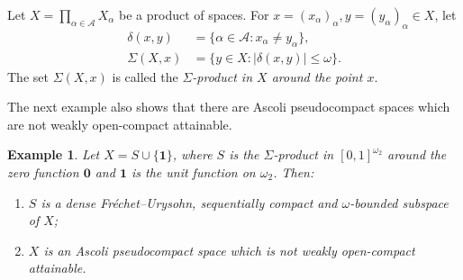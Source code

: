 \documentclass[preprint,11pt]{elsarticle}
\newtheorem{example}[theorem]{Example}
\newtheorem{problem}[theorem]{Problem}
\numberwithin{equation}{section}
\numberwithin{theorem}{section}
\newcommand{\w}{\omega}
\newcommand{\AAA}{\mathcal{A}}
\begin{document}


Let $X=\prod_{\alpha\in \AAA}X_\alpha$ be a product of spaces. For $x=(x_\alpha)_\alpha, y=(y_\alpha)_\alpha\in X$, let
\[
\begin{aligned}
\delta(x,y) &= \{ \alpha\in \AAA : x_\alpha\neq y_\alpha\},\\
\Sigma(X,x) &= \{ y\in X : |\delta(x,y)|\leq\w\}.
\end{aligned}
\]
The set $\Sigma(X,x)$ is called the {\em $\Sigma$-product in $X$ around the point $x$}.


The next example also shows that there are Ascoli pseudocompact spaces which are not weakly open-compact attainable.

\begin{example} \label{exa:non-woca-Ascoli}
Let $X=S\cup\{\mathbf{1}\}$, where $S$ is the $\Sigma$-product in $[0,1]^{\w_2}$ around the zero function $\mathbf{0}$ and $\mathbf{1}$ is the unit function on $\w_2$. Then:
\begin{enumerate}
\item[{\rm(i)}] $S$ is a dense Fr\'{e}chet--Urysohn, sequentially compact and $\w$-bounded subspace of $X$;
\item[{\rm(ii)}]  $X$ is an Ascoli pseudocompact space which is not weakly open-compact attainable.
\end{enumerate}
\end{example}
\end{document}

